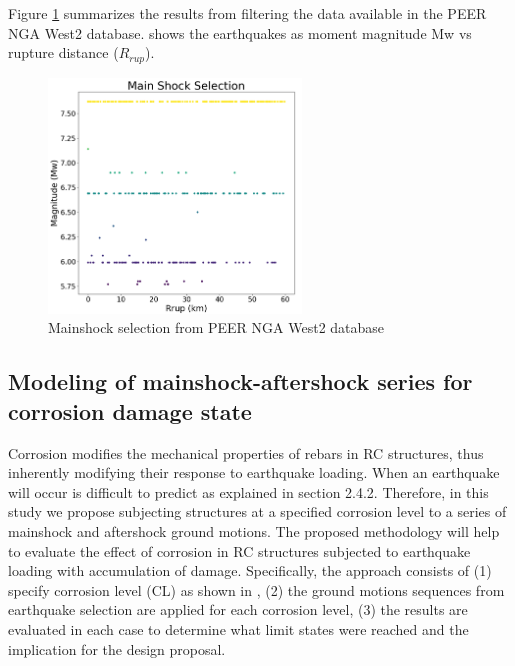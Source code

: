Figure \ref{fig:MS_Selection} summarizes the results from filtering the data available in the PEER NGA West2 database.  shows the earthquakes as moment magnitude {Mw} vs rupture distance ($R_{rup}$).


\begin{figure}[htbp]
	\centering
	\includegraphics[width=0.6\textwidth]{Chapter-5/figs/MainShock_Selection}
	\caption{Mainshock selection from PEER NGA West2 database}
	\label{fig:MS_Selection}
\end{figure}

\subsection{Modeling of mainshock-aftershock series for corrosion damage state}
Corrosion modifies the mechanical properties of rebars in RC structures, thus inherently modifying their response to earthquake loading. When an earthquake will occur is difficult to predict as explained in section 2.4.2. Therefore, in this study we propose subjecting structures at a specified corrosion level to a series of mainshock and aftershock ground motions. The proposed methodology will help to evaluate the effect of corrosion in RC structures subjected to earthquake loading with accumulation of damage. 
Specifically, the approach consists of (1) specify corrosion level (CL) as shown in , (2) the ground motions sequences from earthquake selection are applied for each corrosion level, (3) the results are evaluated in each case to determine what limit states were reached and the implication for the design proposal. 


